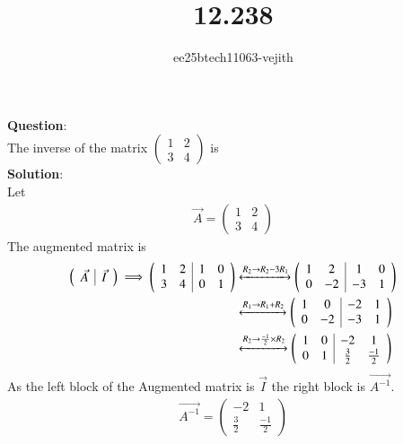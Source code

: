 \documentclass[journal]{IEEEtran}
\begin{document}

\vspace{3cm}

\title{12.238}
\author{ee25btech11063-vejith}

\maketitle
{\let\newpage\relax\maketitle}
\renewcommand{\thefigure}{\theenumi}
\renewcommand{\thetable}{\theenumi}
\setlength{\intextsep}{10pt} %
\textbf{Question}:\\
The inverse of the matrix
$\begin{pmatrix}
    1 & 2\\
    3 & 4
\end{pmatrix}$ is\\
\textbf{Solution}:\\
Let 
\begin{align}
    \Vec{A}=\begin{pmatrix}
    1 & 2\\
    3 & 4
\end{pmatrix}
\end{align}
The augmented matrix is 
\begin{align}
    \left(\begin{array}{c|c}
        \Vec{A} & \Vec{I}
\end{array}\right)
\implies 
\left(\begin{array}{cc|cc}
        1 & 2 & 1 & 0\\
        3 & 4 &  0 & 1
\end{array}\right)  &\xleftrightarrow{R_2 \rightarrow R_2-3R_1} \left(\begin{array}{cc|cc}
        1 & 2 & 1 & 0\\
        0 & -2 &  -3 & 1
\end{array}\right)\\
&\xleftrightarrow{R_1 \rightarrow R_1 + R_2} \left(\begin{array}{cc|cc}
        1 & 0 & -2 & 1\\
        0 & -2 &  -3 & 1
\end{array}\right)\\
&\xleftrightarrow{R_2 \rightarrow \frac{-1}{2} \times R_2} \left(\begin{array}{cc|cc}
        1 & 0 & -2 & 1\\
        0 & 1 &  \frac{3}{2} & \frac{-1}{2}
\end{array}\right)
\end{align}
As the left block of the Augmented matrix is $\Vec{I}$ the right block is $\Vec{A^{-1}}$.
\begin{align}
    \Vec{A^{-1}}=\begin{pmatrix}
    -2 & 1\\
    \frac{3}{2} & \frac{-1}{2}
\end{pmatrix}
\end{align}
\end{document}

